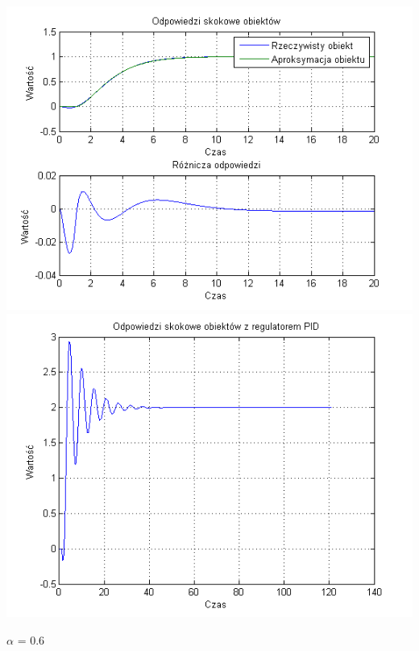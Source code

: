 \documentclass[10pt,a4paper]{article}
\begin{document}
\begin{center}
\includegraphics[scale=1]{images/dwa/skrypt_233.png}\\
\includegraphics[scale=1]{images/dwa/skrypt_234.png}\\
\end{center}
\newpage
$\alpha$ = 0.6
\end{document}
